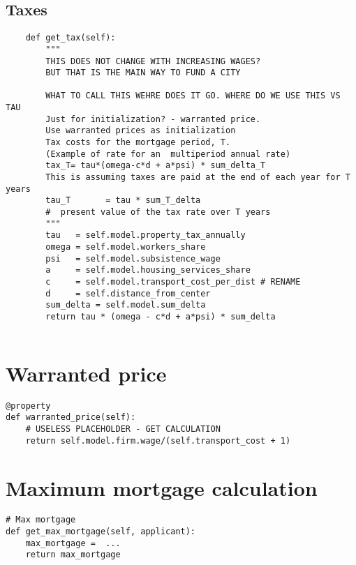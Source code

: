 \subsection{Taxes}
\begin{lstlisting}
    def get_tax(self):
        """ 
        THIS DOES NOT CHANGE WITH INCREASING WAGES?
        BUT THAT IS THE MAIN WAY TO FUND A CITY

        WHAT TO CALL THIS WEHRE DOES IT GO. WHERE DO WE USE THIS VS TAU
        Just for initialization? - warranted price. 
        Use warranted prices as initialization
        Tax costs for the mortgage period, T. 
        (Example of rate for an  multiperiod annual rate)
        tax_T= tau*(omega-c*d + a*psi) * sum_delta_T
        This is assuming taxes are paid at the end of each year for T years
        tau_T       = tau * sum_T_delta 
        #  present value of the tax rate over T years        
        """
        tau   = self.model.property_tax_annually
        omega = self.model.workers_share
        psi   = self.model.subsistence_wage
        a     = self.model.housing_services_share
        c     = self.model.transport_cost_per_dist # RENAME
        d     = self.distance_from_center
        sum_delta = self.model.sum_delta
        return tau * (omega - c*d + a*psi) * sum_delta
\end{lstlisting}

\begin{lstlisting}

\end{lstlisting}




\section{Warranted price}
\begin{lstlisting}
@property
def warranted_price(self):
    # USELESS PLACEHOLDER - GET CALCULATION
    return self.model.firm.wage/(self.transport_cost + 1) 
\end{lstlisting}

\section{Maximum mortgage calculation}

\begin{lstlisting}
# Max mortgage
def get_max_mortgage(self, applicant):
    max_mortgage =  ...
    return max_mortgage
\end{lstlisting}


